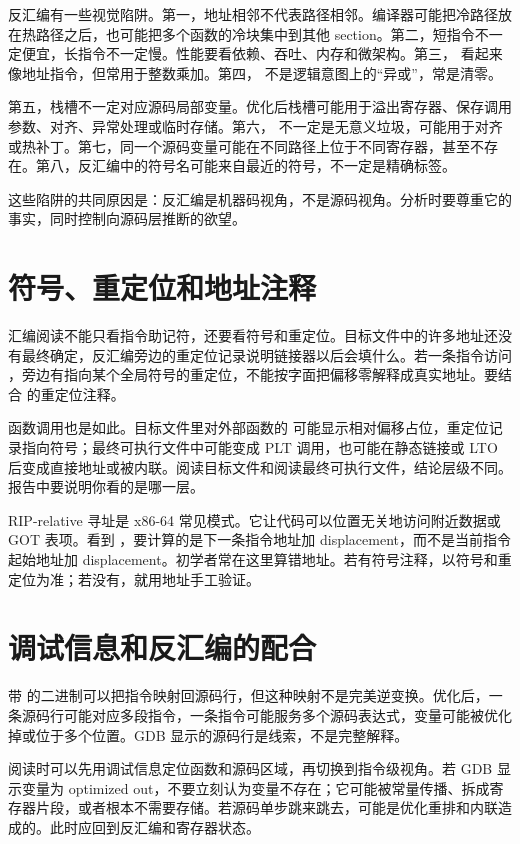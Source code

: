 反汇编有一些视觉陷阱。第一，地址相邻不代表路径相邻。编译器可能把冷路径放在热路径之后，也可能把多个函数的冷块集中到其他 section。第二，短指令不一定便宜，长指令不一定慢。性能要看依赖、吞吐、内存和微架构。第三， 看起来像地址指令，但常用于整数乘加。第四， 不是逻辑意图上的“异或”，常是清零。

第五，栈槽不一定对应源码局部变量。优化后栈槽可能用于溢出寄存器、保存调用参数、对齐、异常处理或临时存储。第六， 不一定是无意义垃圾，可能用于对齐或热补丁。第七，同一个源码变量可能在不同路径上位于不同寄存器，甚至不存在。第八，反汇编中的符号名可能来自最近的符号，不一定是精确标签。

这些陷阱的共同原因是：反汇编是机器码视角，不是源码视角。分析时要尊重它的事实，同时控制向源码层推断的欲望。

\section{符号、重定位和地址注释}

汇编阅读不能只看指令助记符，还要看符号和重定位。目标文件中的许多地址还没有最终确定，反汇编旁边的重定位记录说明链接器以后会填什么。若一条指令访问 ，旁边有指向某个全局符号的重定位，不能按字面把偏移零解释成真实地址。要结合  的重定位注释。

函数调用也是如此。目标文件里对外部函数的  可能显示相对偏移占位，重定位记录指向符号；最终可执行文件中可能变成 PLT 调用，也可能在静态链接或 LTO 后变成直接地址或被内联。阅读目标文件和阅读最终可执行文件，结论层级不同。报告中要说明你看的是哪一层。

RIP-relative 寻址是 x86-64 常见模式。它让代码可以位置无关地访问附近数据或 GOT 表项。看到 ，要计算的是下一条指令地址加 displacement，而不是当前指令起始地址加 displacement。初学者常在这里算错地址。若有符号注释，以符号和重定位为准；若没有，就用地址手工验证。

\section{调试信息和反汇编的配合}

带  的二进制可以把指令映射回源码行，但这种映射不是完美逆变换。优化后，一条源码行可能对应多段指令，一条指令可能服务多个源码表达式，变量可能被优化掉或位于多个位置。GDB 显示的源码行是线索，不是完整解释。

阅读时可以先用调试信息定位函数和源码区域，再切换到指令级视角。若 GDB 显示变量为 optimized out，不要立刻认为变量不存在；它可能被常量传播、拆成寄存器片段，或者根本不需要存储。若源码单步跳来跳去，可能是优化重排和内联造成的。此时应回到反汇编和寄存器状态。

